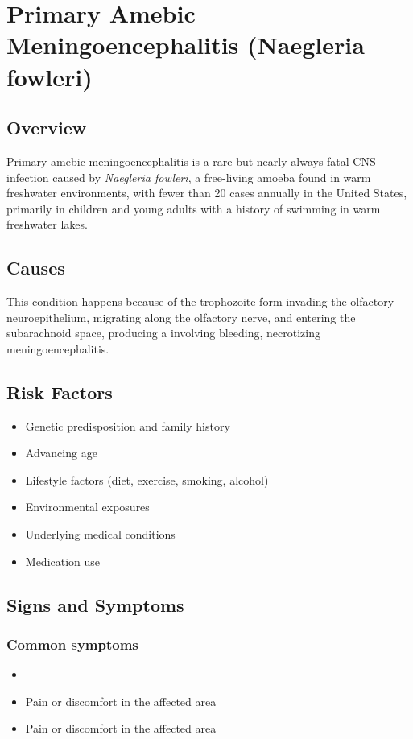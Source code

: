 \chapter{Primary Amebic Meningoencephalitis (Naegleria fowleri)}
\label{sec:Naegleria fowleri}

\section{Overview}
Primary amebic meningoencephalitis is a rare but nearly always fatal CNS infection caused by \textit{Naegleria fowleri}, a free-living amoeba found in warm freshwater environments, with fewer than 20 cases annually in the United States, primarily in children and young adults with a history of swimming in warm freshwater lakes.
\section{Causes}
This condition happens because of the trophozoite form invading the olfactory neuroepithelium, migrating along the olfactory nerve, and entering the subarachnoid space, producing a involving bleeding, necrotizing meningoencephalitis.     
\section{Risk Factors}

\begin{itemize}[noitemsep]
  \item Genetic predisposition and family history
  \item Advancing age
  \item Lifestyle factors (diet, exercise, smoking, alcohol)
  \item Environmental exposures
  \item Underlying medical conditions
  \item Medication use
\end{itemize}
\section{Signs and Symptoms}

\subsection{Common symptoms}
\begin{itemize}[noitemsep]
  \item \item Pain or discomfort in the affected area    \item Pain or discomfort in the affected area
  \end{itemize}

